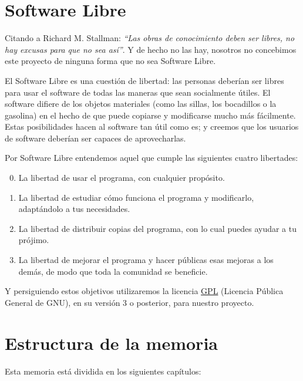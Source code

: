 \section*{Software Libre}

Citando a Richard M. Stallman: {\em ``Las obras de conocimiento deben ser
libres, no hay excusas para que no sea así''}. Y de hecho no las hay, nosotros
no concebimos este proyecto de ninguna forma que no sea Software Libre.

El Software Libre es una cuestión de libertad: las personas deberían ser libres
para usar el software de todas las maneras que sean socialmente útiles. El
software difiere de los objetos materiales (como las sillas, los bocadillos o la
gasolina) en el hecho de que puede copiarse y modificarse mucho más fácilmente.
Estas posibilidades hacen al software tan útil como es; y creemos que los
usuarios de software deberían ser capaces de aprovecharlas.

Por Software Libre entendemos aquel que cumple las siguientes cuatro libertades:

\begin{enumerate}
\setcounter{enumi}{-1}
\item La libertad de usar el programa, con cualquier propósito.
\item La libertad de estudiar cómo funciona el programa y modificarlo,
adaptándolo a tus necesidades.
\item La libertad de distribuir copias del programa, con lo cual puedes ayudar a
tu prójimo.
\item La libertad de mejorar el programa y hacer públicas esas mejoras a los
demás, de modo que toda la comunidad se beneficie.
\end{enumerate}

Y persiguiendo estos objetivos utilizaremos la licencia \hyperref[ap1]{GPL}
(Licencia Pública General de GNU), en su versión 3 o posterior, para nuestro
proyecto.

\section*{Estructura de la memoria}

Esta memoria está dividida en los siguientes capítulos:


